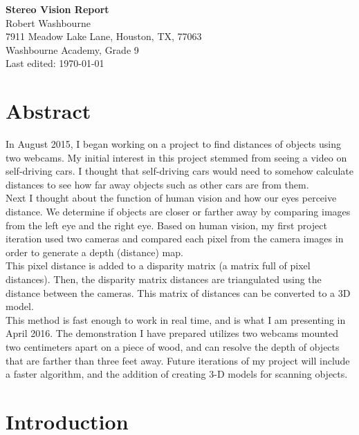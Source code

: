 \documentclass[11pt,fleqn]{article}
\begin{document}
\begin{center}
\huge{\textbf{Stereo Vision Report}}\\[20pt]
\Large{Robert Washbourne}\\[20pt]
7911 Meadow Lake Lane, Houston, TX, 77063\\[20pt]
Washbourne Academy, Grade 9\\[20pt]
Last edited: \today
\end{center}

\newpage
\tableofcontents
\vspace{10pt}
\listoffigures
\newpage
\normalsize

\section{Abstract}

In August 2015, I began working on a project to find distances of objects using two webcams.  My initial interest in this project stemmed from seeing a video on self-driving cars. I thought that self-driving cars would need to somehow calculate distances to see how far away objects such as other cars are from them.\\[5pt]
%
Next I thought about the function of human vision and how our eyes perceive distance. We determine if objects are closer or farther away by comparing images from the left eye and the right eye. Based on human vision, my first project iteration used two cameras and compared each pixel from the camera images in order to generate a depth (distance) map.\\[5pt]
%
This pixel distance is added to a disparity matrix (a matrix full of pixel distances). Then, the disparity matrix distances are triangulated using the distance between the cameras. This matrix of distances can be converted to a 3D model.\\[5pt]
This method is fast enough to work in real time, and is what I am presenting in April 2016. The demonstration I have prepared utilizes two webcams mounted two centimeters apart on a piece of wood, and can resolve the depth of objects that are farther than three feet away. Future iterations of my project will include a faster algorithm, and the addition of creating 3-D models for scanning objects.


\newpage
\section{Introduction}
\end{document}
